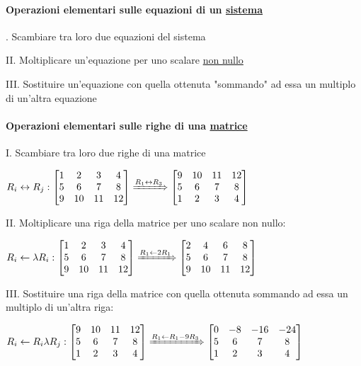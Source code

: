 \documentclass{article}
\begin{document}
\paragraph*{Operazioni elementari sulle equazioni di un \ul{sistema}}
. Scambiare tra loro due equazioni del sistema

II. Moltiplicare un'equazione per uno scalare \ul{non nullo}

III. Sostituire un'equazione con quella ottenuta "sommando" ad essa un multiplo di un'altra equazione

\paragraph*{Operazioni elementari sulle righe di una \ul{matrice}}
I. Scambiare tra loro due righe di una matrice

$R_i\leftrightarrow R_j:
\begin{bmatrix}
1&2&3&4\\
5&6&7&8\\
9&10&11&12
\end{bmatrix}\xRightarrow{R_1\leftrightarrow R_3}\begin{bmatrix}
9&10&11&12\\
5&6&7&8\\
1&2&3&4
\end{bmatrix}$

II. Moltiplicare una riga della matrice per uno scalare non nullo:

$R_i\leftarrow\lambda R_i:
\begin{bmatrix}
1&2&3&4\\
5&6&7&8\\
9&10&11&12
\end{bmatrix}\xRightarrow{R_1\leftarrow2R_1}\begin{bmatrix}
2&4&6&8\\
5&6&7&8\\
9&10&11&12
\end{bmatrix}$


III. Sostituire una riga della matrice con quella ottenuta sommando ad essa un multiplo di un'altra riga:

$R_i\leftarrow R_i\lambda R_j:
\begin{bmatrix}
9&10&11&12\\
5&6&7&8\\
1&2&3&4
\end{bmatrix}\xRightarrow{R_1\leftarrow R_1-9R_3}\begin{bmatrix}
0&-8&-16&-24\\
5&6&7&8\\
1&2&3&4
\end{bmatrix}$
\end{document}
